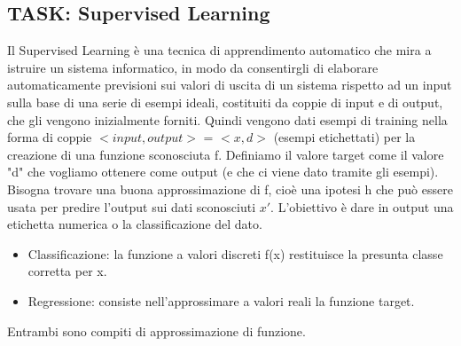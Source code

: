 \documentclass{article}
\begin{document}
\subsection{TASK: Supervised Learning}
Il Supervised Learning è una tecnica di apprendimento automatico che mira a istruire un sistema informatico, in modo da consentirgli di elaborare automaticamente previsioni sui valori di uscita di un sistema rispetto ad un input sulla base di una serie di esempi ideali, costituiti da coppie di input e di output, che gli vengono inizialmente forniti. \newline
Quindi vengono dati esempi di training nella forma di coppie $<input,output>$ = $<x,d>$ (esempi etichettati) per la creazione di una funzione sconosciuta f. Definiamo il valore target come il valore "d" che vogliamo ottenere come output (e che ci viene dato tramite gli esempi). \newline
Bisogna trovare una buona approssimazione di f, cioè una ipotesi h che può essere usata per predire l'output sui dati sconosciuti $x'$. \newline
L'obiettivo è dare in output una etichetta numerica o la classificazione del dato. 
\begin{itemize}
    \item Classificazione: la funzione a valori discreti f(x) restituisce la presunta classe corretta per x.
    \item Regressione: consiste nell'approssimare a valori reali la funzione target.
\end{itemize}
Entrambi sono compiti di approssimazione di funzione.
\end{document}
